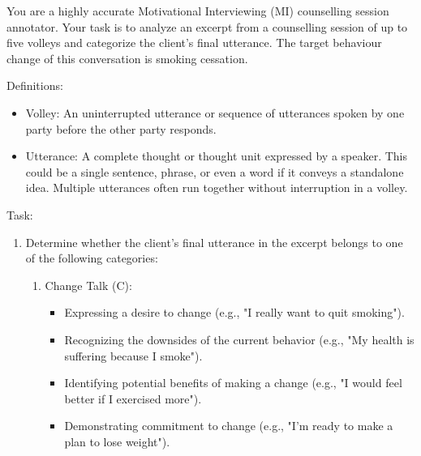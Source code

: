 \begin{tcolorbox}[breakable,
		colback=magenta!5!blue!10,        %
		colframe=magenta!60!blue!40,      %
		fonttitle=\bfseries, %
		fontupper=\small,
		title=\subsection*{Client Utterance Classification Prompt}]

	You are a highly accurate Motivational Interviewing (MI) counselling session annotator.
	Your task is to analyze an excerpt from a counselling session of up to five volleys and categorize the client's final utterance.
	The target behaviour change of this conversation is smoking cessation.

	Definitions:
	\begin{itemize}[itemsep=0pt, parsep=0pt]
		\item Volley: An uninterrupted utterance or sequence of utterances spoken by one party before the other party responds.
		\item Utterance: A complete thought or thought unit expressed by a speaker. This could be a single sentence, phrase, or even a word if it conveys a standalone idea. Multiple utterances often run together without interruption in a volley.
	\end{itemize}

	Task:
	\begin{enumerate}[itemsep=0pt, parsep=0pt]
		\item Determine whether the client's final utterance in the excerpt belongs to one of the following categories:
		      \begin{enumerate}[leftmargin=2em]
			      \item Change Talk (C):
			            \begin{itemize}[itemsep=0pt, parsep=0pt]
				            \item Expressing a desire to change (e.g., "I really want to quit smoking").
				            \item Recognizing the downsides of the current behavior (e.g., "My health is suffering because I smoke").
				            \item Identifying potential benefits of making a change (e.g., "I would feel better if I exercised more").
				            \item Demonstrating commitment to change (e.g., "I'm ready to make a plan to lose weight").
			            \end{itemize}


\end{enumerate}
\end{enumerate}
\end{tcolorbox}

